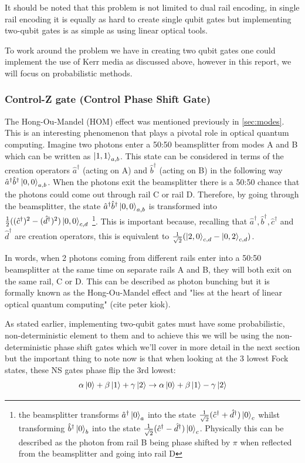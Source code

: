 It should be noted that this problem is not limited to dual rail encoding, in single rail encoding it is equally as hard to create single qubit gates but implementing two-qubit gates is as simple as using linear optical tools.

To work around the problem we have in creating two qubit gates one could implement the use of Kerr media as discussed above, however in this report, we will focus on probabilistic methods.


\subsubsection{Control-Z gate (Control Phase Shift Gate)}
The Hong-Ou-Mandel (HOM) effect was mentioned previously in \cref{sec:modes}. This is an interesting phenomenon that plays a pivotal role in optical quantum computing. Imagine two photons enter a 50:50 beamsplitter from modes A and B which can be written as $\ket{1,1}_{a,b}$. This state can be considered in terms of the creation operators $\hat{a}^\dagger$ (acting on A) and $\hat{b}^\dagger$ (acting on B) in the following way $\hat{a}^\dagger\hat{b}^\dagger\ket{0,0}_{a,b}$. When the photons exit the beamsplitter there is a 50:50 chance that the photons could come out through rail C or rail D. Therefore, by going through the beamsplitter, the state $\hat{a}^\dagger\hat{b}^\dagger\ket{0,0}_{a,b}$ is transformed into $\frac{1}{2}((\hat{c}^\dagger)^2 - (\hat{d}^\dagger)^2)\ket{0,0}_{c,d}$ \footnote{ the beamsplitter transforms $\hat{a}^\dagger\ket{0}_a$ into the state $\frac{1}{\sqrt{2}}(\hat{c}^\dagger + \hat{d}^\dagger)\ket{0}_c$ whilst transforming  $\hat{b}^\dagger\ket{0}_b$ into the state $\frac{1}{\sqrt{2}}(\hat{c}^\dagger - \hat{d}^\dagger)\ket{0}_c$. Physically this can be described as the photon from rail B being phase shifted by $\pi$ when reflected from the beamsplitter and going into rail D}. This is important because, recalling that $\hat{a}^\dagger, \hat{b}^\dagger, \hat{c}^\dagger$ and $\hat{d}^\dagger$ are creation operators, this is equivalent to $\frac{1}{\sqrt{2}}(\ket{2,0}_{c,d} - \ket{0,2}_{c,d})$.

In words, when 2 photons coming from different rails enter into a 50:50 beamsplitter at the same time on separate rails A and B, they will both exit on the same rail, C or D. This can be described as photon bunching but it is formally known as the Hong-Ou-Mandel effect and "lies at the heart of linear optical quantum computing" (cite peter kiok).

As stated earlier, implementing two-qubit gates must have some probabilistic, non-deterministic element to them and to achieve this we will be using the non-deterministic phase shift gates which we'll cover in more detail in the next section but the important thing to note now is that when looking at the 3 lowest Fock states, these NS gates phase flip the 3rd lowest:
\begin{equation} \label{NS evolution}
    \alpha\ket{0} + \beta\ket{1} + \gamma\ket{2} \rightarrow \alpha\ket{0} + \beta\ket{1} - \gamma\ket{2}
\end{equation}

